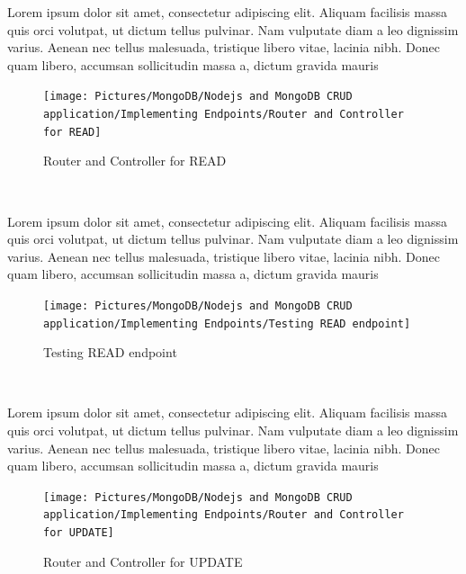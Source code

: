 \begin{spacing}{1.2}
\par Lorem ipsum dolor sit amet, consectetur adipiscing elit. Aliquam facilisis massa quis orci volutpat, ut dictum tellus pulvinar. Nam vulputate diam a leo dignissim varius. Aenean nec tellus malesuada, tristique libero vitae, lacinia nibh. Donec quam libero, accumsan sollicitudin massa a, dictum gravida mauris
\\
\begin{figure}[!htb] 
\begin{center} 
\texttt{[image: Pictures/MongoDB/Nodejs and MongoDB CRUD  application/Implementing Endpoints/Router and Controller for READ]} 
\end{center} 
\caption{Router and Controller for READ} 
\end{figure}  \FloatBarrier
\\

\par Lorem ipsum dolor sit amet, consectetur adipiscing elit. Aliquam facilisis massa quis orci volutpat, ut dictum tellus pulvinar. Nam vulputate diam a leo dignissim varius. Aenean nec tellus malesuada, tristique libero vitae, lacinia nibh. Donec quam libero, accumsan sollicitudin massa a, dictum gravida mauris
\\
\begin{figure}[!htb] 
\begin{center} 
\texttt{[image: Pictures/MongoDB/Nodejs and MongoDB CRUD  application/Implementing Endpoints/Testing READ endpoint]} 
\end{center} 
\caption{Testing READ endpoint} 
\end{figure}  \FloatBarrier
\\

\par Lorem ipsum dolor sit amet, consectetur adipiscing elit. Aliquam facilisis massa quis orci volutpat, ut dictum tellus pulvinar. Nam vulputate diam a leo dignissim varius. Aenean nec tellus malesuada, tristique libero vitae, lacinia nibh. Donec quam libero, accumsan sollicitudin massa a, dictum gravida mauris
\\
\begin{figure}[!htb] 
\begin{center} 
\texttt{[image: Pictures/MongoDB/Nodejs and MongoDB CRUD  application/Implementing Endpoints/Router and Controller for UPDATE]} 
\end{center} 
\caption{Router and Controller for UPDATE} 
\end{figure}  \FloatBarrier
\\


\end{spacing}
